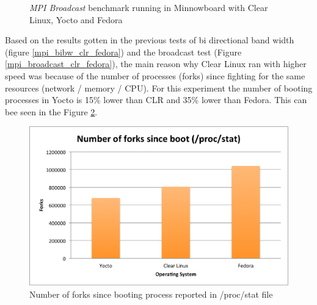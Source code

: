 \begin{figure}[H]
\begin{center}
\end{center}
\caption{\textit{MPI Broadcast} benchmark running in Minnowboard with Clear Linux, Yocto and Fedora }
\label{mpi_broadcast_yocto}
\end{figure}

Based on the results gotten in the previous tests of bi directional band
width (figure \ref{mpi_bibw_clr_fedora}) and the broadcast test (Figure
\ref{mpi_broadcast_clr_fedora}), the main reason why Clear Linux ran with
higher speed was because of the number of processes (forks) since fighting for
the same resources (network / memory / CPU). For this experiment the number of
booting processes in Yocto is 15\% lower than CLR and 35\%
lower than Fedora. This can bee seen in the Figure \ref{number_forks_yocto}.

\begin{figure}[H]
\centering
\includegraphics[width=1 \textwidth]{images/number_forks_yocto.png}
\caption{Number of forks since booting process reported in /proc/stat file }
\label{number_forks_yocto}
\end{figure}

